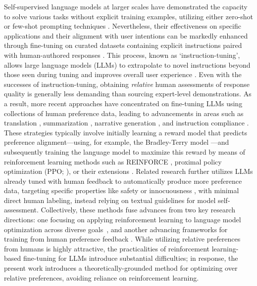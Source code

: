Self-supervised language models at larger scales have demonstrated the capacity to solve various tasks without explicit training examples, utilizing either zero-shot \citep{radford2019language} or few-shot prompting techniques \citep{gpt3,megatron,chowdhery2022palm}. Nevertheless, their effectiveness on specific applications and their alignment with user intentions can be markedly enhanced through fine-tuning on curated datasets containing explicit instructions paired with human-authored responses \citep{mishra-etal-2022-cross,sanh2022multitask,chung2022scaling,thoppilan2022lamda}. This process, known as `instruction-tuning', allows large language models (LLMs) to extrapolate to novel instructions beyond those seen during tuning and improves overall user experience \citep{chung2022scaling}. Even with the successes of instruction-tuning, obtaining \textit{relative} human assessments of response quality is generally less demanding than sourcing expert-level demonstrations. As a result, more recent approaches have concentrated on fine-tuning LLMs using collections of human preference data, leading to advancements in areas such as translation \citep{kreutzer-etal-2018-reliability}, summarization \citep{stiennon2022learning,ziegler2020finetuning}, narrative generation \citep{ziegler2020finetuning}, and instruction compliance \citep{ouyang2022training,ramamurthy2023is}. These strategies typically involve initially learning a reward model that predicts preference alignment—using, for example, the Bradley-Terry model \citep{bradley1952rankanalysis}—and subsequently training the language model to maximize this reward by means of reinforcement learning methods such as REINFORCE \citep{williams1992reinforce}, proximal policy optimization (PPO; \cite{schulman2017proximal}), or their extensions \citep{ramamurthy2023is}. Related research further utilizes LLMs already tuned with human feedback to automatically produce more preference data, targeting specific properties like safety or innocuousness \citep{bai2022constitutional}, with minimal direct human labeling, instead relying on textual guidelines for model self-assessment. Collectively, these methods fuse advances from two key research directions: one focusing on applying reinforcement learning to language model optimization across diverse goals~\citep{Ranzato2015SequenceLT,paulus2018a,wu2018learning}, and another advancing frameworks for training from human preference feedback \citep{christiano2017deep,kupcsik2018learning}. While utilizing relative preferences from humans is highly attractive, the practicalities of reinforcement learning-based fine-tuning for LLMs introduce substantial difficulties; in response, the present work introduces a theoretically-grounded method for optimizing over relative preferences, avoiding reliance on reinforcement learning.

